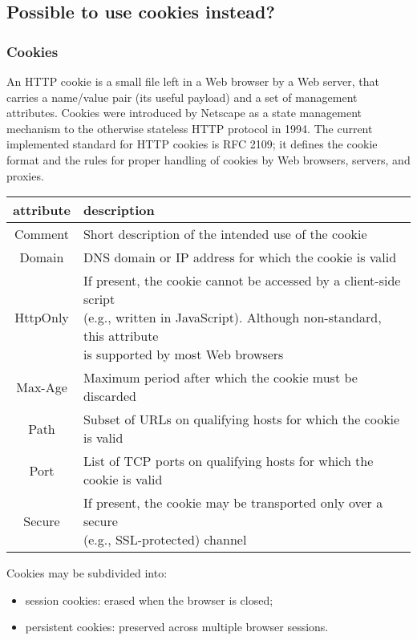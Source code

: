 \documentclass[a4paper, 10pt, titlepage]{article}
\begin{document}
\subsection{Possible to use cookies instead?}
\subsubsection{Cookies}
An HTTP cookie is a small file left in a Web browser by a Web server, that carries a name/value pair (its useful payload) and a set of management attributes. Cookies were introduced by Netscape as a state management mechanism to the otherwise stateless HTTP protocol in 1994. The current implemented standard for HTTP cookies is RFC 2109; it defines the cookie format and the rules for proper handling of cookies by Web browsers, servers, and proxies. \medskip\\
\begin{tabular}{|c|l|} \hline
\textbf{attribute} & \textbf{description} \\ \hline \hline
Comment & Short description of the intended use of the cookie \\ \hline
Domain & DNS domain or IP address for which the cookie is valid \\ \hline
HttpOnly & \thead{If present, the cookie cannot be accessed by a client-side script\\(e.g., written in JavaScript). Although non-standard, this attribute \\is supported by most Web browsers} \\ \hline
Max-Age & Maximum period after which the cookie must be discarded \\ \hline
Path & Subset of URLs on qualifying hosts for which the cookie is valid \\ \hline
Port & List of TCP ports on qualifying hosts for which the cookie is valid\\ \hline
Secure & \thead{If present, the cookie may be transported only over a secure \\(e.g., SSL-protected) channel} \\ \hline
\end{tabular} 
Cookies may be subdivided into:
\begin{itemize}
\item session cookies: erased when the browser is closed;
\item persistent cookies: preserved across multiple browser sessions.
\end{itemize}
\end{document}
